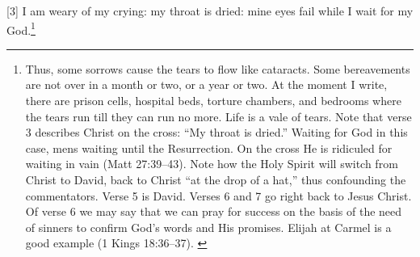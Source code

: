 [3] \textcolor[rgb]{0.00,0.00,1.00}{I am weary of my crying: my throat is dried: mine eyes fail while I wait for my God.}\footnote{Thus, some sorrows cause the tears to flow like cataracts. Some bereavements are not over in a month or two, or a year or two. At the moment I write, there are prison cells, hospital beds, torture chambers, and bedrooms where the tears run till they can run no more. Life is a vale of tears. Note that verse 3 describes Christ on the cross: “My throat is dried.” Waiting for God in this case, mens waiting until the Resurrection. On the cross He is ridiculed for waiting in vain (Matt 27:39--43). Note how the Holy Spirit will switch from Christ to David, back to Christ “at the drop of a hat,” thus confounding the commentators. Verse 5 is David. Verses 6 and 7 go right back to Jesus Christ. Of verse 6 we may say that we can pray for success on the basis of the need of sinners to confirm God’s words and His promises. Elijah at Carmel is a good example (1 Kings 18:36--37). \cite{Ruckman1992Psalms}  }
